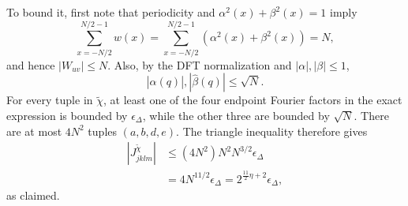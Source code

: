\documentclass[aps,floatfix,10pt,amssymb,amsfont,amsmath,superscriptaddress,float,nofootinbib,longbibliography,nobalancelastpage,twocolumn]{revtex4-2}
\begin{document}
To bound it, first note that periodicity and $\alpha^2(x)+\beta^2(x)=1$ imply
\begin{equation}
    \sum_{x=-N/2}^{N/2-1}w(x)
    =\sum_{x=-N/2}^{N/2-1}\left(\alpha^2(x)+\beta^2(x)\right)=N,
\end{equation}
and hence $|W_{uv}|\leq N$. Also, by the DFT normalization and $|\alpha|,|\beta|\leq1$,
\begin{equation}
    |\hat\alpha(q)|,|\hat\beta(q)|\leq\sqrt N.
\end{equation}
For every tuple in $\tilde\chi$, at least one of the four endpoint Fourier factors in the exact expression is bounded by $\epsilon_{\Delta}$, while the other three are bounded by $\sqrt N$. There are at most $4N^2$ tuples $(a,b,d,e)$. The triangle inequality therefore gives
\begin{equation}
\begin{split}
    |J_{jklm}^{\tilde\chi}|
    &\leq (4N^2)N^2N^{3/2}\epsilon_{\Delta}\\
    &=4N^{11/2}\epsilon_{\Delta}
    =2^{\frac{11}{2}\eta+2}\epsilon_{\Delta},
\end{split}
\end{equation}
as claimed.
\end{document}
